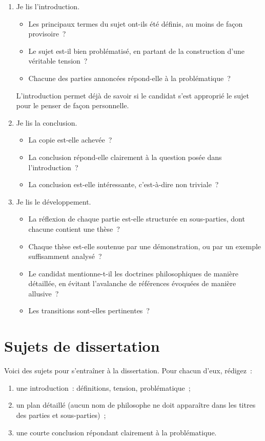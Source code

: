 \documentclass[a4paper]{article}
\begin{document}
\begin{enumerate}
\item Je lis l'introduction.
\begin{itemize}
\item Les principaux termes du sujet ont-ils été définis, au moins de
      façon provisoire ?
\item Le sujet est-il bien problématisé, en partant de la construction
      d'une véritable tension ?
\item Chacune des parties annoncées répond-elle à la problématique ?
\end{itemize}
L'introduction permet déjà de savoir si le candidat s'est approprié
   le sujet pour le penser de façon personnelle.
\item Je lis la conclusion.
\begin{itemize}
\item La copie est-elle achevée ?
\item La conclusion répond-elle clairement à la question posée dans
      l'introduction ?
\item La conclusion est-elle intéressante, c'est-à-dire non triviale ?
\end{itemize}
\item Je lis le développement.
\begin{itemize}
\item La réflexion de chaque partie est-elle structurée en sous-parties,
      dont chacune contient une thèse ?
\item Chaque thèse est-elle soutenue par une démonstration, ou par un
      exemple suffisamment analysé ?
\item Le candidat mentionne-t-il les doctrines philosophiques de manière
      détaillée, en évitant l'avalanche de références évoquées de
      manière allusive ?
\item Les transitions sont-elles pertinentes ?
\end{itemize}
\end{enumerate}
\section{Sujets de dissertation}
\label{sec-6}


Voici des sujets pour s'entraîner à la dissertation. Pour chacun d'eux,
rédigez :

\begin{enumerate}
\item une introduction : définitions, tension, problématique ;
\item un plan détaillé (aucun nom de philosophe ne doit apparaître dans les
   titres des parties et sous-parties) ;
\item une courte conclusion répondant clairement à la problématique.
\end{enumerate}
\end{document}
